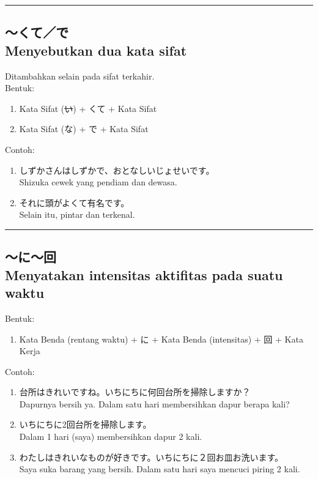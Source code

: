 \vspace{0.2cm}\hrule height 1pt\vspace{0.2cm}


\subsection*{
    ～くて／で \\
    Menyebutkan dua kata sifat
}
Ditambahkan selain pada sifat terkahir.\\
Bentuk:
\begin{enumerate}
    \item Kata Sifat (\sout{い}) + くて + Kata Sifat
    \item Kata Sifat (な) + で + Kata Sifat
\end{enumerate}
Contoh: 
\begin{enumerate}
    \item しずかさんはしずかで、おとなしいじょせいです。
    \\ Shizuka cewek yang pendiam dan dewasa.
    \item それに頭がよくて有名です。
    \\ Selain itu, pintar dan terkenal.
\end{enumerate}

\vspace{0.2cm}\hrule height 1pt\vspace{0.2cm}

\newpage
\subsection*{
    ～に～回 \\
    Menyatakan intensitas aktifitas pada suatu waktu
}
Bentuk:
\begin{enumerate}
    \item Kata Benda (rentang waktu) + に + Kata Benda (intensitas)
    + 回 + Kata Kerja
\end{enumerate}
Contoh: 
\begin{enumerate}
    \item 台所はきれいですね。いちにちに何回台所を掃除しますか？
    \\ Dapurnya bersih ya. Dalam satu hari membersihkan dapur berapa kali?
    \item いちにちに2回台所を掃除します。
    \\ Dalam 1 hari (saya) membersihkan dapur 2 kali.
    \item わたしはきれいなものが好きです。いちにちに２回お皿お洗います。
    \\ Saya suka barang yang bersih. Dalam satu hari saya mencuci piring 2 kali.
\end{enumerate}


